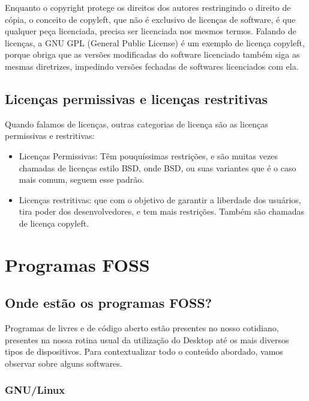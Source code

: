 \documentclass[12pt, a4paper]{report}
\begin{document}
Enquanto o copyright protege os direitos dos autores restringindo o direito de cópia, o conceito de copyleft, que não é exclusivo de licenças de software, é que qualquer peça licenciada, precisa ser licenciada nos mesmos termos. Falando de licenças, a GNU GPL (General Public License) é um exemplo de licença copyleft, porque obriga que as versões modificadas do software licenciado também siga as mesmas diretrizes, impedindo versões fechadas de softwares licenciados com ela.

\section{Licenças permissivas e licenças restritivas}


Quando falamos de licenças, outras categorias de licença são as licenças permissivas e restritivas:

\begin{itemize}

  \item{Licenças Permissivas: Têm pouquíssimas restrições, e são muitas vezes chamadas de licenças estilo BSD, onde BSD, ou suas variantes que é o caso mais comum, seguem esse padrão.}

  \item{Licenças restritivas: que com o objetivo de garantir a liberdade dos usuários, tira poder dos desenvolvedores, e tem mais restrições. Também são chamadas de licença copyleft.}

\end{itemize}

\chapter{Programas FOSS}

\section{Onde estão os programas FOSS?}

Programas de livres e de código aberto estão presentes no nosso cotidiano, presentes na nossa rotina usual da utilização do Desktop até os mais diversos tipos de dispositivos. Para contextualizar todo o conteúdo abordado, vamos observar sobre alguns softwares.

\subsection{GNU/Linux}
\end{document}

